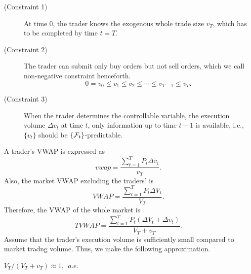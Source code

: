 \begin{description}
 \item[(Constraint 1)] At time 0, the trader knows the exogenous whole trade 
size $v_T$, which has to be completed by time $t=T$.
 \item[(Constraint 2)] The trader can submit only buy orders but not sell 
orders, which we call non-negative constraint henceforth.
\[
 0 = v_0 \leq v_1 \leq v_2 \leq \cdots \leq v_{T-1} \leq v_T.
\]
\item[(Constraint 3)] When the trader determines the controllable variable, the 
execution volume $\Delta v_t$ at time $t$, only information up to time $t-1$ is 
available, i.e., $\{ v_t \}$ should be $\{ {\cal F}_t \}$-predictable.
\end{description}
A trader's VWAP is expressed as
\[ %
  vwap=\frac{\sum_{t=1}^T P_t \Delta v_t}{v_T}.
\] %
Also, the market VWAP excluding the traders' is
\[ %
  VWAP=\frac{\sum_{t=1}^T P_t \Delta V_t}{V_T}.
\] %
Therefore, the VWAP of the whole market is
\[ %
  TVWAP=\frac{\sum_{t=1}^T P_t (\Delta V_t + \Delta v_t)}{V_T+v_T}.
\] %
Assume that the trader's execution volume is sufficiently small compared to 
market tradng volume.  Thus, we make the following approximation.

\begin{approximation}\label{appr_d1}
 \quad $V_T/(V_T+v_T) \approx 1,\ \ a.e.$
\end{approximation}

